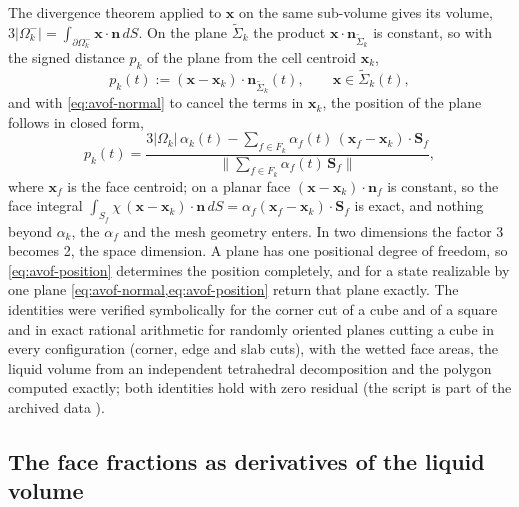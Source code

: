 \documentclass[preprint,12pt]{elsarticle}
\newcommand{\x}{\mathbf{x}}
\newcommand{\n}{\mathbf{n}}
\newcommand{\Sf}{\mathbf{S}_f}
\newcommand{\nSk}{\mathbf{n}_{\tilde{\Sigma}_k}}
\begin{document}
The divergence theorem applied to $\x$ on the same sub-volume gives its volume, $3|\Omega_k^-| = \int_{\partial\Omega_k^-}\x\cdot\n\,dS$. On the plane $\tilde{\Sigma}_k$ the product $\x\cdot\nSk$ is constant, so with the signed distance $p_k$ of the plane from the cell centroid $\x_k$,
\begin{equation}
p_k(t) := (\x - \x_k)\cdot\nSk(t), \qquad \x \in \tilde{\Sigma}_k(t),
\label{eq:planeoffset}
\end{equation}
and with \cref{eq:avof-normal} to cancel the terms in $\x_k$, the position of the plane follows in closed form,
\begin{equation}
p_k(t) = \frac{3|\Omega_k|\,\alpha_k(t) - \sum_{f \in F_k}\alpha_f(t)\,(\x_f - \x_k)\cdot\Sf}{\big\|\sum_{f \in F_k}\alpha_f(t)\,\Sf\big\|},
\label{eq:avof-position}
\end{equation}
where $\x_f$ is the face centroid; on a planar face $(\x - \x_k)\cdot\n_f$ is constant, so the face integral $\int_{S_f}\chi\,(\x - \x_k)\cdot\n\,dS = \alpha_f(\x_f - \x_k)\cdot\Sf$ is exact, and nothing beyond $\alpha_k$, the $\alpha_f$ and the mesh geometry enters. In two dimensions the factor 3 becomes 2, the space dimension. A plane has one positional degree of freedom, so \cref{eq:avof-position} determines the position completely, and for a state realizable by one plane \cref{eq:avof-normal,eq:avof-position} return that plane exactly. The identities were verified symbolically for the corner cut of a cube and of a square and in exact rational arithmetic for randomly oriented planes cutting a cube in every configuration (corner, edge and slab cuts), with the wetted face areas, the liquid volume from an independent tetrahedral decomposition and the polygon computed exactly; both identities hold with zero residual (the script is part of the archived data \citep{LeiaRepo2026}).

\subsection{The face fractions as derivatives of the liquid volume}
\label{sec:derivatives}


\end{document}
